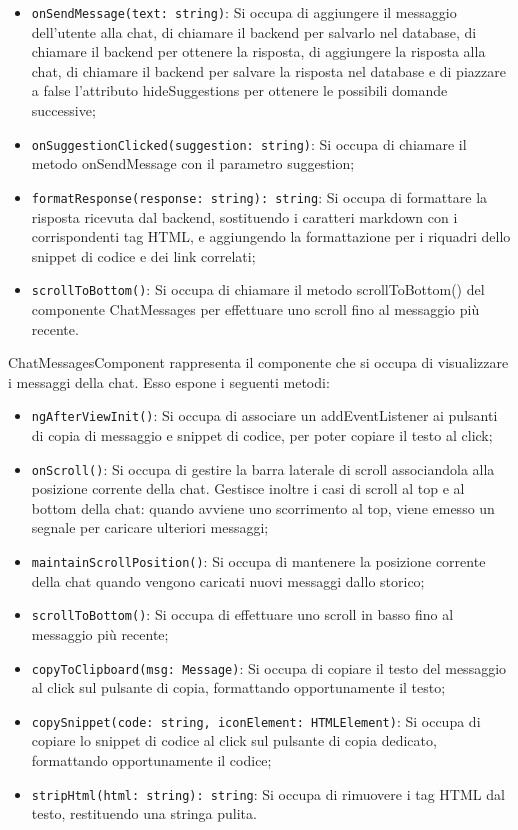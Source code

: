 \begin{itemize}
    \item \texttt{onSendMessage(text: string)}: Si occupa di aggiungere il messaggio dell'utente alla chat, di chiamare il backend per salvarlo nel database, di chiamare il backend per ottenere la risposta, di aggiungere la risposta alla chat, di chiamare il backend per salvare la risposta nel database e di piazzare a false l'attributo hideSuggestions per ottenere le possibili domande successive;
    \item \texttt{onSuggestionClicked(suggestion: string)}: Si occupa di chiamare il metodo onSendMessage con il parametro suggestion;
    \item \texttt{formatResponse(response: string): string}: Si occupa di formattare la risposta ricevuta dal backend, sostituendo i caratteri markdown con i corrispondenti tag HTML, e aggiungendo la formattazione per i riquadri dello snippet di codice e dei link correlati;
    \item \texttt{scrollToBottom()}: Si occupa di chiamare il metodo scrollToBottom() del componente ChatMessages per effettuare uno scroll fino al messaggio più recente.
\end{itemize}

\label{sec:chat_messages_component}
ChatMessagesComponent rappresenta il componente che si occupa di visualizzare i messaggi della chat.
Esso espone i seguenti metodi:
\begin{itemize}
    \item \texttt{ngAfterViewInit()}: Si occupa di associare un addEventListener ai pulsanti di copia di messaggio e snippet di codice, per poter copiare il testo al click;
    \item \texttt{onScroll()}: Si occupa di gestire la barra laterale di scroll associandola alla posizione corrente della chat. Gestisce inoltre i casi di scroll al top e al bottom della chat: quando avviene uno scorrimento al top, viene emesso un segnale per caricare ulteriori messaggi;
    \item \texttt{maintainScrollPosition()}: Si occupa di mantenere la posizione corrente della chat quando vengono caricati nuovi messaggi dallo storico;
    \item \texttt{scrollToBottom()}: Si occupa di effettuare uno scroll in basso fino al messaggio più recente;
    \item \texttt{copyToClipboard(msg: Message)}: Si occupa di copiare il testo del messaggio al click sul pulsante di copia, formattando opportunamente il testo;
    \item \texttt{copySnippet(code: string, iconElement: HTMLElement)}: Si occupa di copiare lo snippet di codice al click sul pulsante di copia dedicato, formattando opportunamente il codice;
    \item \texttt{stripHtml(html: string): string}: Si occupa di rimuovere i tag HTML dal testo, restituendo una stringa pulita.
\end{itemize}

